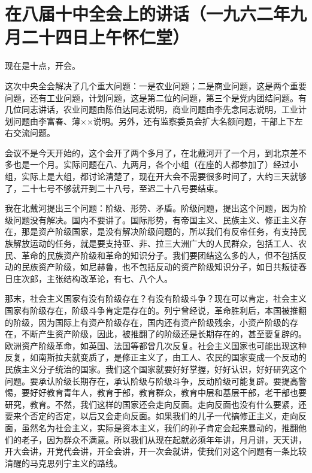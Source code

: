 \section{在八届十中全会上的讲话（一九六二年九月二十四日上午怀仁堂）}


现在是十点，开会。

这次中央全会解决了几个重大问题：一是农业问题；二是商业问题，这是两个重要问题，还有工业问题，计划问题，这是第二位的问题，第三个是党内团结问题。有几位同志讲话，农业问题由陈伯达同志说明，商业问题由李先念同志说明，工业计划问题由李富春、薄××说明。另外，还有监察委员会扩大名额问题，干部上下左右交流问题。

会议不是今天开始的，这个会开了两个多月了，在北戴河开了一个月，到北京差不多也是一个月。实际问题在八、九两月，各个小组（在座的人都参加了）经过小组，实际上是大组，都讨论清楚了，现在开大会不需要很多时间了，大约三天就够了，二十七号不够就开到二十八号，至迟二十八号要结束。

我在北戴河提出三个问题：阶级、形势、矛盾。阶级问题，提出这个问题，因为阶级问题没有解决。国内不要讲了。国际形势，有帝国主义、民族主义、修正主义存在，那是资产阶级国家，是没有解决阶级问题的，所以我们有反帝任务，有支持民族解放运动的任务，就是要支持亚、非、拉三大洲广大的人民群众，包括工人、农民、革命的民族资产阶级和革命的知识分子。我们要团结这么多的人，但不包括反动的民族资产阶级，如尼赫鲁，也不包括反动的资产阶级知识分子，如日共叛徒春日庄次郎，主张结构改革论，有七、八个人。

那末，社会主义国家有没有阶级存在？有没有阶级斗争？现在可以肯定，社会主义国家有阶级存在，阶级斗争肯定是存在的。列宁曾经说，革命胜利后，本国被推翻的阶级，因为国际上有资产阶级存在，国内还有资产阶级残余，小资产阶级的存在，不断产生资产阶级，因此，被推翻了的阶级还是长期存在的，甚至要复辟的。欧洲资产阶级革命，如英国、法国等都曾几次反复。社会主义国家也可能出现这种反复，如南斯拉夫就变质了，是修正主义了，由工人、农民的国家变成一个反动的民族主义分子统治的国家。我们这个国家就要好好掌握，好好认识，好好研究这个问题。要承认阶级长期存在，承认阶级与阶级斗争，反动阶级可能复辟。要提高警惕，要好好教育青年人，教育于部，教育群众，教育中层和基层干部，老干部也要研究，教育。不然，我们这样的国家还会走向反面。走向反面也没有什么要紧，还要来个否定的否定，以后又会走向反面。如果我们的儿子一代搞修正主义，走向反面，虽然名为社会主义，实际是资本主义，我们的孙子肯定会起来暴动的，推翻他们的老子，因为群众不满意。所以我们从现在起就必须年年讲，月月讲，天天讲，开大会讲，开党代会讲，开全会讲，开一次会就讲，使我们对这个问题有一条比较清醒的马克思列宁主义的路线。

